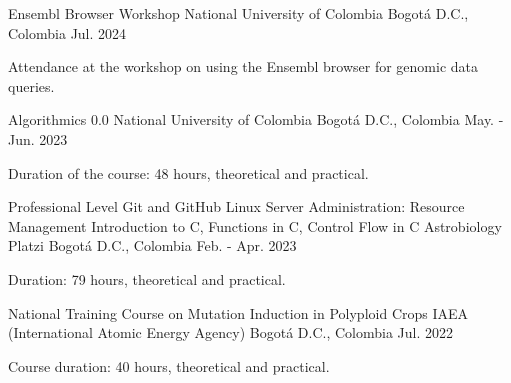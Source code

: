     
    \begin{cventries}
    
    \cventry
    {Ensembl Browser Workshop} %
    {National University of Colombia} %
    {Bogotá D.C., Colombia} %
    {Jul. 2024} %
    { %
    \begin{cvitems}
    \item {Attendance at the workshop on using the Ensembl browser for genomic data queries.}
    \end{cvitems}
    }
    
    
    \cventry
    {Algorithmics 0.0} %
    {National University of Colombia} %
    {Bogotá D.C., Colombia} %
    {May. - Jun. 2023} %
    { %
    \begin{cvitems}
    \item {Duration of the course: 48 hours, theoretical and practical.}
    \end{cvitems}
    }
    
    
    \cventry
    {Professional Level Git and GitHub
    \newline
    Linux Server Administration: Resource Management
    \newline
    Introduction to C, Functions in C, Control Flow in C
    \newline
    Astrobiology} %
    {Platzi} %
    {Bogotá D.C., Colombia} %
    {Feb. - Apr. 2023} %
    { %
    \begin{cvitems}
    \item {Duration: 79 hours, theoretical and practical.}
    \end{cvitems}
    }
    
    
    \cventry
    {National Training Course on Mutation Induction in Polyploid Crops} %
    {IAEA (International Atomic Energy Agency)} %
    {Bogotá D.C., Colombia} %
    {Jul. 2022} %
    { %
    \begin{cvitems}
    \item {Course duration: 40 hours, theoretical and practical.}
    \end{cvitems}
    }
    

\end{cventries}
